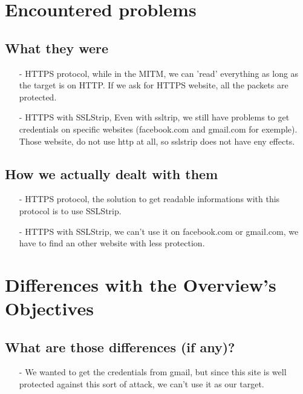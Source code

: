 \documentclass[a4paper, 11pt, oneside]{article}
\begin{document}
\section{Encountered problems}

\subsection{What they were}
\begin{itemize}
    \item[-] HTTPS protocol, while in the MITM, we can 'read' everything as long as the target is on HTTP. If we ask for HTTPS website, all the packets are protected. \\
    \item[-] HTTPS with SSLStrip, Even with ssltrip, we still have problems to get credentials on specific websites (facebook.com and gmail.com for exemple). Those website, do not use http at all, so sslstrip does not have eny effects.\\
\end{itemize}

\subsection{How we actually dealt with them}
\begin{itemize}
    \item[-] HTTPS protocol, the solution to get readable informations with this protocol is to use SSLStrip.\\
    \item[-] HTTPS with SSLStrip, we can't use it on facebook.com or gmail.com, we have to find an other website with less protection.\\
\end{itemize}
    
\section{Differences with the Overview's Objectives}

\subsection{What are those differences (if any)?}
\begin{itemize}
    \item[-] We wanted to get the credentials from gmail, but since this site is well protected against this sort of attack, we can't use it as our target.\\
\end{itemize}
\end{document}
